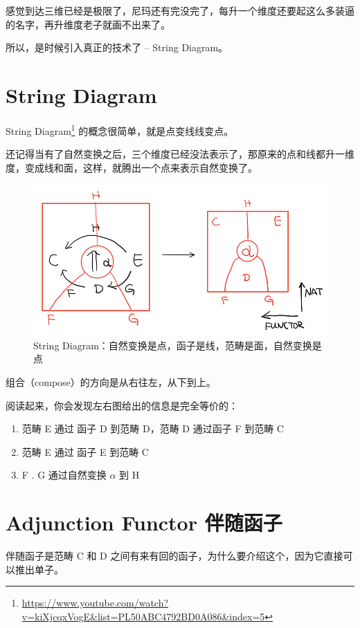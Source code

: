 \documentclass[letterspacing]{tufte-book}
\begin{document}
感觉到达三维已经是极限了，尼玛还有完没完了，每升一个维度还要起这么多装逼的名字，再升维度老子就画不出来了。

所以，是时候引入真正的技术了 -- String Diagram。

\chapter{String Diagram}
\label{sec:orga9ad355}

String Diagram\footnote{\url{https://www.youtube.com/watch?v=kiXjcqxVogE\&list=PL50ABC4792BD0A086\&index=5}} 的概念很简单，就是点变线线变点。

还记得当有了自然变换之后，三个维度已经没法表示了，那原来的点和线都升一维度，变成线和面，这样，就腾出一个点来表示自然变换了。

\begin{figure}[htbp]
\centering
\includegraphics[width=.9\linewidth]{images/p1-string-diagram.png}
\caption{String Diagram：自然变换是点，函子是线，范畴是面，自然变换是点}
\end{figure}

组合（compose）的方向是从右往左，从下到上。

阅读起来，你会发现左右图给出的信息是完全等价的：
\begin{enumerate}
\item 范畴 E 通过 函子 D 到范畴 D，范畴 D 通过函子 F 到范畴 C
\item 范畴 E 通过 函子 E 到范畴 C
\item F . G 通过自然变换 \(\alpha\) 到 H
\end{enumerate}

\chapter{Adjunction Functor 伴随函子}
\label{sec:orgda3fd5f}
伴随函子是范畴 C 和 D 之间有来有回的函子，为什么要介绍这个，因为它直接可以推出单子。
\end{document}
